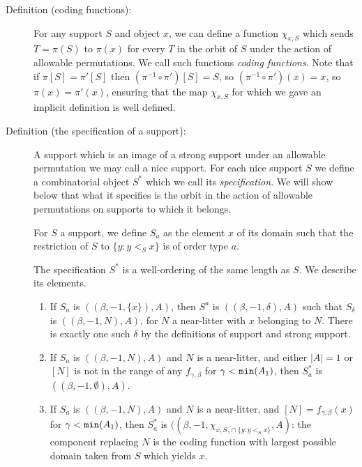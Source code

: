 \documentclass[112pt]{article}
\begin{document}
\begin{description}

\item[Definition (coding functions):]  For any support $S$ and object $x$, we can define a function $\chi_{x,S}$ which sends $T=\pi(S)$ to $\pi(x)$ for every $T$ in the orbit of $S$ under
the action of allowable permutations.  We call such functions {\em coding functions\/}.  Note that if $\pi[S]=\pi'[S]$ then $(\pi^{-1}\circ \pi')[S]= S$, so 
$(\pi^{-1}\circ \pi')(x)= x$, so $\pi(x)=\pi'(x)$, ensuring that the map $\chi_{x,S}$ for which we gave an implicit definition is well defined.

\item[Definition (the specification of a support):]  A support which is an image of a strong support under an allowable permutation we may call a nice support.  For each nice support $S$ we define a combinatorial object $S^*$ which we call its {\em specification\/}.  We will show below that what it specifies is the orbit in the action of allowable permutations on supports to which it belongs.

For $S$ a support, we define $S_a$ as the element $x$ of its domain such that the restriction of $S$ to $\{y:y <_S x\}$ is of order type $a$.

The specification $S^*$ is a well-ordering of the same length as $S$.  We describe its elements.

\begin{enumerate}

\item  If $S_{a}$ is $((\beta,-1,\{x\}),A)$, then $S^a$ is $((\beta,-1,\delta),A)$ such that $S_\delta$ is $((\beta,-1,N),A)$, for $N$ a near-litter with $x$ belonging to $N$.  There is exactly one such $\delta$ by the definitions of support and strong support.

\item  If $S_a$ is $((\beta,-1,N),A)$ and $N$ is a near-litter, and either $|A|=1$ or $[N]$ is not in the range of any $f_{\gamma,\beta}$ for $\gamma<{\tt min}(A_1)$, then $S^*_a$ is $((\beta,-1,\emptyset),A)$.

\item  If $S_a$ is $((\beta,-1,N),A)$ and $N$ is a near-litter, and $[N]=f_{\gamma,\beta}(x)$ for $\gamma<{\tt min}(A_1)$, then 
$S^*_a$ is $((\beta,-1,\chi_{x,S_{\gamma}\cap \{y:y <_S x\}},A)$:  the component replacing $N$ is the coding function with largest possible domain taken from $S$ which yields $x$.

\end{enumerate}


\end{description}
\end{document}
